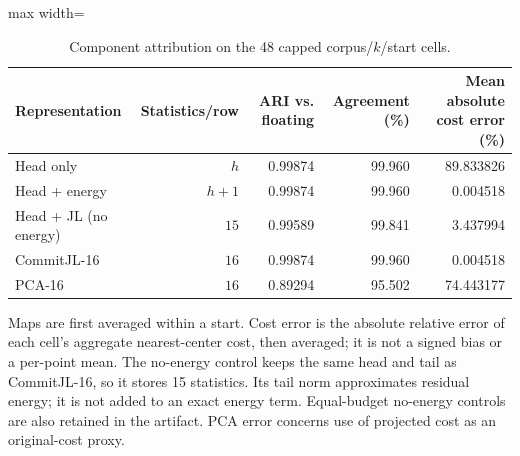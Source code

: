 \begin{table}[tp]
\caption{Component attribution on the 48 capped corpus/$k$/start cells.}\label{tab:ablation-a}
\centering\small
\begin{adjustbox}{max width=\textwidth}
\begin{tabular}{@{}lrrrr@{}}
\toprule
Representation & Statistics/row & ARI vs. floating & Agreement (\%) & Mean absolute cost error (\%) \\
\midrule
Head only & $h$ & 0.99874 & 99.960 & 89.833826 \\
Head + energy & $h+1$ & 0.99874 & 99.960 & 0.004518 \\
Head + JL (no energy) & $15$ & 0.99589 & 99.841 & 3.437994 \\
CommitJL-16 & $16$ & 0.99874 & 99.960 & 0.004518 \\
PCA-16 & $16$ & 0.89294 & 95.502 & 74.443177 \\
\bottomrule
\end{tabular}
\end{adjustbox}
\par\vspace{3pt}\begin{minipage}{0.98\textwidth}\footnotesize Maps are first averaged within a start. Cost error is the absolute relative error of each cell's aggregate nearest-center cost, then averaged; it is not a signed bias or a per-point mean. The no-energy control keeps the same head and tail as CommitJL-16, so it stores 15 statistics. Its tail norm approximates residual energy; it is not added to an exact energy term. Equal-budget no-energy controls are also retained in the artifact. PCA error concerns use of projected cost as an original-cost proxy.\end{minipage}
\end{table}
